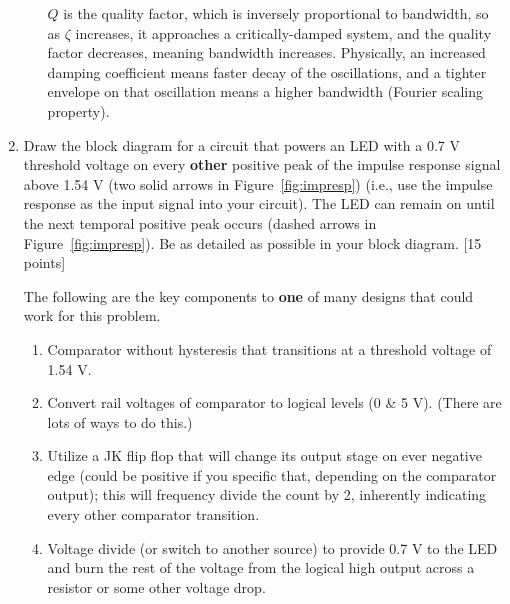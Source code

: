 \begin{enumerate}
\begin{itemize}
$Q$ is the quality factor, which is inversely proportional to bandwidth, so as $\zeta$ increases, it approaches a critically-damped system, and the quality factor decreases, meaning bandwidth increases.  Physically, an increased damping coefficient means faster decay of the oscillations, and a tighter envelope on that oscillation means a higher bandwidth (Fourier scaling property).

\end{itemize}

\item Draw the block diagram for a circuit that powers an LED with a 0.7 V
threshold voltage on every {\bf other} positive peak of the impulse response
signal above 1.54 V (two solid arrows in Figure~\ref{fig:impresp}) (i.e., use
the impulse response as the input signal into your circuit).  The LED can
remain on until the next temporal positive peak occurs (dashed arrows in
Figure~\ref{fig:impresp}).  Be as detailed as possible in your block diagram.
[15 points]

The following are the key components to {\bf one} of many designs that could work for this problem.

\begin{enumerate}
\item Comparator without hysteresis that transitions at a threshold voltage of 1.54 V.
\item Convert rail voltages of comparator to logical levels (0 \& 5 V).  (There are lots of ways to do this.)
\item Utilize a JK flip flop that will change its output stage on ever negative edge (could be positive if you specific that, depending on the comparator output); this will frequency divide the count by 2, inherently indicating every other comparator transition.
\item Voltage divide (or switch to another source) to provide 0.7 V to the LED and burn the rest of the voltage from the logical high output across a resistor or some other voltage drop.
\end{enumerate}


\end{enumerate}



